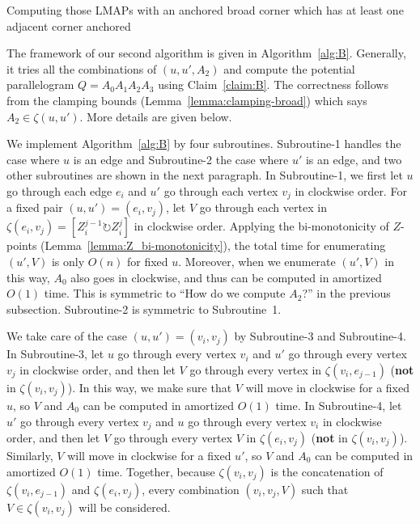 \documentclass{ws-ijcga}
\begin{document}
\begin{algorithm}[h]
\caption{Computing those LMAPs with an anchored broad corner which has at least one adjacent corner anchored}\label{alg:B}
\end{algorithm}

The framework of our second algorithm is given in Algorithm~\ref{alg:B}.
Generally, it tries all the combinations of $(u,u',A_2)$ and compute the potential parallelogram $Q=A_0A_1A_2A_3$ using Claim~\ref{claim:B}.
The correctness follows from the clamping bounds (Lemma~\ref{lemma:clamping-broad}) which says $A_2\in \zeta(u,u')$.
More details are given below.

We implement Algorithm~\ref{alg:B} by four subroutines.
Subroutine-1 handles the case where $u$ is an edge and Subroutine-2 the case where $u'$ is an edge, and
two other subroutines are shown in the next paragraph.
In Subroutine-1, we first let $u$ go through each edge $e_i$ and $u'$ go through each vertex $v_j$ in clockwise order.
For a fixed pair $(u,u')=(e_i,v_j)$, let $V$ go through each vertex in $\zeta(e_i,v_j)=[Z_i^{j-1}\circlearrowright Z_i^j]$ in clockwise order.
Applying the bi-monotonicity of $Z$-points (Lemma~\ref{lemma:Z_bi-monotonicity}), the total time for enumerating $(u',V)$ is only $O(n)$ for fixed $u$.
Moreover, when we enumerate $(u',V)$ in this way, $A_0$ also goes in clockwise, and thus can be computed in amortized $O(1)$ time.
  This is symmetric to ``How do we compute $A_2$?'' in the previous subsection. Subroutine-2 is symmetric to Subroutine~1.

\smallskip We take care of the case $(u,u')=(v_i,v_j)$ by Subroutine-3 and Subroutine-4.
In Subroutine-3, let $u$ go through every vertex $v_i$ and $u'$ go through every vertex $v_j$ in clockwise order,
  and then let $V$ go through every vertex in $\zeta(v_i,e_{j-1})$ (\textbf{not} in $\zeta(v_i,v_j)$).
  In this way, we make sure that $V$ will move in clockwise for a fixed $u$, so $V$ and $A_0$ can be computed in amortized $O(1)$ time.
In Subroutine-4, let $u'$ go through every vertex $v_j$ and $u$ go through every vertex $v_i$ in clockwise order,
  and then let $V$ go through every vertex $V$ in $\zeta(e_i,v_j)$ (\textbf{not} in $\zeta(v_i,v_j)$).
  Similarly, $V$ will move in clockwise for a fixed $u'$, so $V$ and $A_0$ can be computed in amortized $O(1)$ time.
Together, because $\zeta(v_i,v_j)$ is the concatenation of $\zeta(v_i,e_{j-1})$ and $\zeta(e_i,v_j)$,
  every combination $(v_i,v_j,V)$ such that $V\in\zeta(v_i,v_j)$ will be considered.
\end{document}
